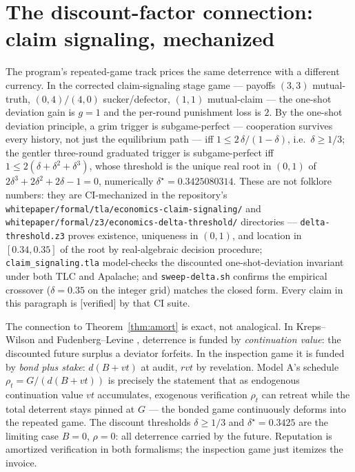 \documentclass[11pt,a4paper]{article}
\begin{document}
\section{The discount-factor connection: claim signaling, mechanized}\label{sec:signaling}
The program's repeated-game track prices the same deterrence with a different currency. In the corrected claim-signaling stage game --- payoffs $(3,3)$ mutual-truth, $(0,4)/(4,0)$ sucker/defector, $(1,1)$ mutual-claim --- the one-shot deviation gain is $g = 1$ and the per-round punishment loss is $2$. By the one-shot deviation principle, a grim trigger is subgame-perfect --- cooperation survives every history, not just the equilibrium path --- iff $1 \le 2\,\delta/(1-\delta)$, i.e.\ $\delta \ge 1/3$; the gentler three-round graduated trigger is subgame-perfect iff $1 \le 2(\delta + \delta^2 + \delta^3)$, whose threshold is the unique real root in $(0,1)$ of $2\delta^3 + 2\delta^2 + 2\delta - 1 = 0$, numerically $\delta^\star = 0.3425080314$. These are not folklore numbers: they are CI-mechanized in the repository's \texttt{whitepaper/formal/tla/economics-claim-signaling/} and \texttt{whitepaper/formal/z3/economics-delta-threshold/} directories --- \texttt{delta-threshold.z3} proves existence, uniqueness in $(0,1)$, and location in $[0.34, 0.35]$ of the root by real-algebraic decision procedure; \texttt{claim\_signaling.tla} model-checks the discounted one-shot-deviation invariant under both TLC and Apalache; and \texttt{sweep-delta.sh} confirms the empirical crossover ($\delta = 0.35$ on the integer grid) matches the closed form. Every claim in this paragraph is [verified] by that CI suite.

The connection to Theorem~\ref{thm:amort} is exact, not analogical. In Kreps--Wilson \cite{krepswilson1982} and Fudenberg--Levine \cite{fudenberglevine1989}, deterrence is funded by \emph{continuation value}: the discounted future surplus a deviator forfeits. In the inspection game it is funded by \emph{bond plus stake}: $d(B + vt)$ at audit, $rvt$ by revelation. Model A's schedule $\rho_t = G/(d(B+vt))$ is precisely the statement that as endogenous continuation value $vt$ accumulates, exogenous verification $\rho_t$ can retreat while the total deterrent stays pinned at $G$ --- the bonded game continuously deforms into the repeated game. The discount thresholds $\delta \ge 1/3$ and $\delta^\star = 0.3425$ are the limiting case $B = 0$, $\rho = 0$: all deterrence carried by the future. Reputation is amortized verification in both formalisms; the inspection game just itemizes the invoice.
\end{document}
